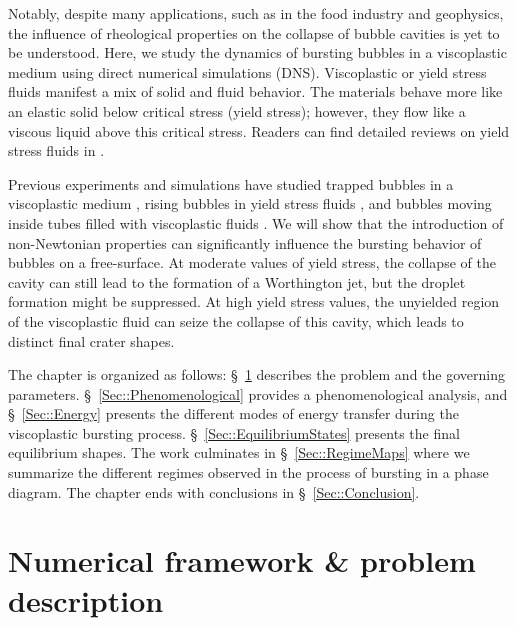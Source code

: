 Notably, despite many applications, such as in the food industry and geophysics, the influence of rheological properties on the collapse of bubble cavities is yet to be understood. Here, we study the dynamics of bursting bubbles in a viscoplastic medium using direct numerical simulations (DNS). Viscoplastic or yield stress fluids manifest a mix of solid and fluid behavior. The materials behave more like an elastic solid below critical stress (yield stress); however, they flow like a viscous liquid above this critical stress. Readers can find detailed reviews on yield stress fluids in \citet{bird1983rheology,coussot2014yield,balmforth2014yielding,bonn2017yield}.

Previous experiments and simulations have studied trapped bubbles in a viscoplastic medium \citep{dubash2004conditions,sun2020dynamic, de2019oscillations}, rising bubbles in yield stress fluids \citep{sikorski2009motion,tripathi2015bubble, lopez2018rising,singh2008interacting, dimakopoulos2013steady, tsamopoulos2008steady, mougin2012significant}, and bubbles moving inside tubes filled with viscoplastic fluids \citep{jalaal2016long, laborie2017yield, zamankhan2018steady}. We will show that the introduction of non-Newtonian properties can significantly influence the bursting behavior of bubbles on a free-surface. At moderate values of yield stress, the collapse of the cavity can still lead to the formation of a Worthington jet, but the droplet formation might be suppressed. At high yield stress values, the unyielded region of the viscoplastic fluid can seize the collapse of this cavity, which leads to distinct final crater shapes.

The chapter is organized as follows: \S~\ref{Sec::ProblemDescription} describes the problem and the governing parameters. \S~\ref{Sec::Phenomenological} provides a phenomenological analysis, and \S~\ref{Sec::Energy} presents the different modes of energy transfer during the viscoplastic bursting process. \S~\ref{Sec::EquilibriumStates} presents the final equilibrium shapes. The work culminates in \S~\ref{Sec::RegimeMaps} where we summarize the different regimes observed in the process of bursting in a phase diagram. The chapter ends with conclusions in \S~\ref{Sec::Conclusion}.

\section{Numerical framework \& problem description}\label{Sec::ProblemDescription}

